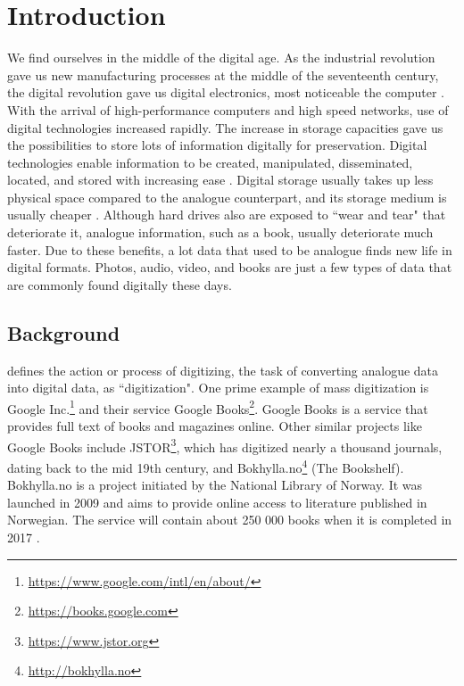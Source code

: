
\chapter{Introduction}
\label{ch:introduction}
We find ourselves in the middle of the digital age. As the industrial revolution gave us new manufacturing processes at the middle of the seventeenth century, the digital revolution gave us digital electronics, most noticeable the computer \citep{freeman2001time}. With the arrival of high-performance computers and high speed networks, use of digital technologies increased rapidly. The increase in storage capacities gave us the possibilities to store lots of information digitally for preservation. Digital technologies enable information to be created, manipulated, disseminated, located, and stored with increasing ease \citep{lee2002state}. Digital storage usually takes up less physical space compared to the analogue counterpart, and its storage medium is usually cheaper \citep{morris2003evolution}. Although hard drives also are exposed to ``wear and tear" that deteriorate it, analogue information, such as a book, usually deteriorate much faster. Due to these benefits, a lot data that used to be analogue finds new life in digital formats. Photos, audio, video, and books are just a few types of data that are commonly found digitally these days.


\section{Background}
\citep{misc-oed-digitization} defines the action or process of digitizing, the task of converting analogue data into digital data, as ``digitization". One prime example of mass digitization is Google Inc.\footnote{\url{https://www.google.com/intl/en/about/}} and their service Google Books\footnote{\url{https://books.google.com}}. Google Books is a service that provides full text of books and magazines online. Other similar projects like Google Books include JSTOR\footnote{\url{https://www.jstor.org}}, which has digitized nearly a thousand journals, dating back to the mid 19th century, and Bokhylla.no\footnote{\url{http://bokhylla.no}} (The Bookshelf). Bokhylla.no is a project initiated by the National Library of Norway. It was launched in 2009 and aims to provide online access to literature published in Norwegian. The service will contain about 250 000 books when it is completed in 2017 \citep{misc-nb-digial-library}.

